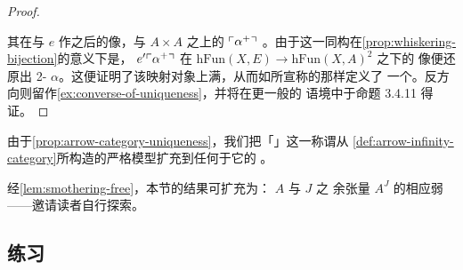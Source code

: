 \begin{proof}
\begin{center}
\end{center}
其在与 $e$ 作\trPostComposition{}之后的像，与 $A\times A$ 之上的 $\ulcorner\alpha^{+}\urcorner$%
\trFiberedIsomorphism{}。由于这一同构在\cref{prop:whiskering-bijection}的意义下是\trFibered{}，%
$e'\ulcorner\alpha^{+}\urcorner$ 在\trFunctor{} $\mathrm{hFun}(X,E)\to\mathrm{hFun}(X,A)^{2}$ 之下的%
像便还原出 2-\trCell{} $\alpha$。这便证明了该映射对象上满，从而如所宣称的那样定义了%
一个\trSmotheringFunctor{}。反方向则留作\cref{ex:converse-of-uniqueness}，并将在更一般的%
语境中于命题 3.4.11 得证。
\end{proof}

\begin{convention}\label{conv:arrow-infinity-category-appellation}
由于\cref{prop:arrow-category-uniqueness}，我们把「\trArrowInfinityCategory」这一称谓从%
\cref{def:arrow-infinity-category}所构造的严格模型扩充到任何\trFiberedEquivalence{}于它的%
\trInfinityCategory{}。
\end{convention}

经\cref{lem:smothering-free}，本节的结果可扩充为：\trInfinityCategory{} $A$ 与\trFreeCategory{} $J$ 之%
余张量 $A^{J}$ 的相应弱\trUniversalProperty——邀请读者自行探索。

\subsection*{练习}

